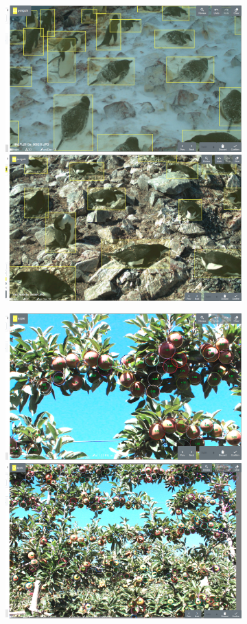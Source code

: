 \begin{figure}[h!]
\centering
\begin{subfigure}[t]{1.0\linewidth}
  \includegraphics[width=0.475\linewidth]{figures/annotation/screenshots/penguins.png}
  \hfill
  \includegraphics[width=0.475\linewidth]{figures/annotation/screenshots/penguins2.png}
  \caption{}
\end{subfigure}

\begin{subfigure}[t]{1.0\linewidth}
  \includegraphics[width=0.475\linewidth]{figures/annotation/screenshots/apples_big.png}
  \hfill
  \includegraphics[width=0.475\linewidth]{figures/annotation/screenshots/apples_small.png}
  \caption{}

\end{subfigure}



\end{figure}
